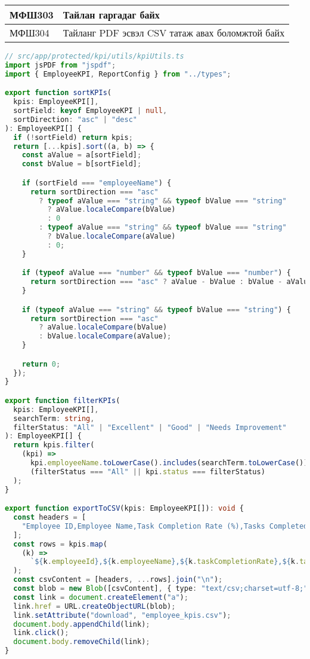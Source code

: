 \begin{table}[H]
    \centering
    \label{my-label-3}
    \begin{tabular}{|p{1.7cm}|p{12cm}|}
        \hline
          МФШ303 & Тайлан гаргадаг байх\\ \hline
          МФШ304 & Тайланг PDF эсвэл CSV татаж авах боломжтой байх\\ \hline
    \end{tabular}
\end{table}

\begin{lstlisting}[language=Typescript, caption=Тайлан автоматаар гаргах, frame=single]
    // src/app/protected/kpi/utils/kpiUtils.ts
import jsPDF from "jspdf";
import { EmployeeKPI, ReportConfig } from "../types";

export function sortKPIs(
  kpis: EmployeeKPI[],
  sortField: keyof EmployeeKPI | null,
  sortDirection: "asc" | "desc"
): EmployeeKPI[] {
  if (!sortField) return kpis;
  return [...kpis].sort((a, b) => {
    const aValue = a[sortField];
    const bValue = b[sortField];

    if (sortField === "employeeName") {
      return sortDirection === "asc"
        ? typeof aValue === "string" && typeof bValue === "string"
          ? aValue.localeCompare(bValue)
          : 0
        : typeof aValue === "string" && typeof bValue === "string"
          ? bValue.localeCompare(aValue)
          : 0;
    }

    if (typeof aValue === "number" && typeof bValue === "number") {
      return sortDirection === "asc" ? aValue - bValue : bValue - aValue;
    }

    if (typeof aValue === "string" && typeof bValue === "string") {
      return sortDirection === "asc"
        ? aValue.localeCompare(bValue)
        : bValue.localeCompare(aValue);
    }

    return 0;
  });
}

export function filterKPIs(
  kpis: EmployeeKPI[],
  searchTerm: string,
  filterStatus: "All" | "Excellent" | "Good" | "Needs Improvement"
): EmployeeKPI[] {
  return kpis.filter(
    (kpi) =>
      kpi.employeeName.toLowerCase().includes(searchTerm.toLowerCase()) &&
      (filterStatus === "All" || kpi.status === filterStatus)
  );
}

export function exportToCSV(kpis: EmployeeKPI[]): void {
  const headers = [
    "Employee ID,Employee Name,Task Completion Rate (%),Tasks Completed,Tasks Assigned,Project Contribution (%),Projects Assigned,Performance Score,Status",
  ];
  const rows = kpis.map(
    (k) =>
      `${k.employeeId},${k.employeeName},${k.taskCompletionRate},${k.tasksCompleted},${k.tasksAssigned},${k.projectContribution},${k.projectsAssigned},${k.performanceScore},${k.status}`
  );
  const csvContent = [headers, ...rows].join("\n");
  const blob = new Blob([csvContent], { type: "text/csv;charset=utf-8;" });
  const link = document.createElement("a");
  link.href = URL.createObjectURL(blob);
  link.setAttribute("download", "employee_kpis.csv");
  document.body.appendChild(link);
  link.click();
  document.body.removeChild(link);
}


\end{lstlisting}
